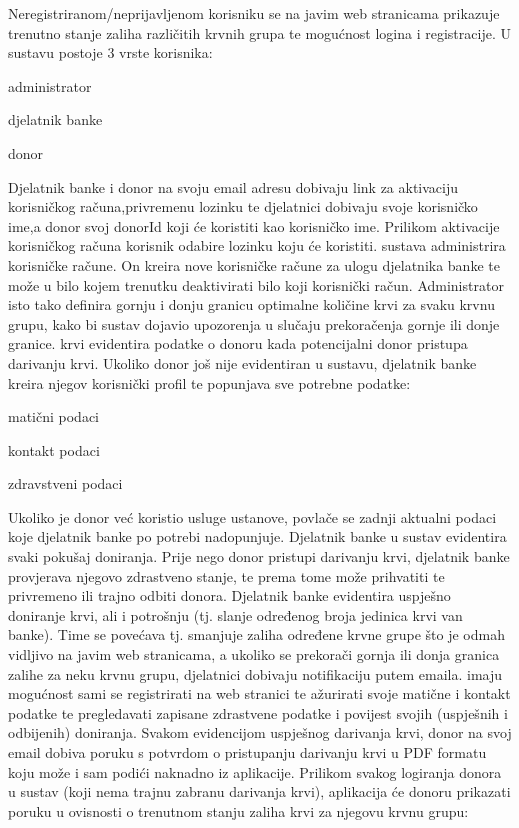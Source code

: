 		Neregistriranom/neprijavljenom korisniku se na javim web stranicama prikazuje trenutno stanje zaliha različitih krvnih grupa te mogućnost logina i registracije. U sustavu postoje 3 vrste korisnika:
		\begin{packed_item}
			\item{administrator}
			\item{djelatnik banke}
			\item{donor}
		\end{packed_item}
		Djelatnik banke i donor na svoju email adresu dobivaju link za aktivaciju korisničkog računa,privremenu lozinku te djelatnici dobivaju svoje korisničko ime,a donor svoj donorId koji će koristiti kao korisničko ime. Prilikom aktivacije korisničkog računa korisnik odabire lozinku koju će koristiti.
		sustava administrira korisničke račune. On kreira nove korisničke račune za ulogu djelatnika banke te može u bilo kojem trenutku deaktivirati bilo koji korisnički račun. Administrator isto tako definira gornju i donju granicu optimalne količine krvi za svaku krvnu grupu, kako bi sustav dojavio upozorenja u slučaju prekoračenja gornje ili donje granice.
		krvi evidentira podatke o donoru kada potencijalni donor pristupa darivanju krvi. Ukoliko donor još nije evidentiran u sustavu, djelatnik banke kreira njegov korisnički profil te popunjava sve potrebne podatke:
		\begin{packed_item}
			\item{matični podaci}
			\item{kontakt podaci}
			\item{zdravstveni podaci}
		\end{packed_item}
		Ukoliko je donor već koristio usluge ustanove, povlače se zadnji aktualni podaci koje djelatnik banke po potrebi nadopunjuje. Djelatnik banke u sustav evidentira svaki pokušaj doniranja. Prije nego donor pristupi darivanju krvi, djelatnik banke provjerava njegovo zdrastveno stanje, te prema tome može prihvatiti te privremeno ili trajno odbiti donora.
		Djelatnik banke evidentira uspješno doniranje krvi, ali i potrošnju (tj. slanje određenog broja jedinica krvi van banke). Time se povećava tj. smanjuje zaliha određene krvne grupe što je odmah vidljivo na javim web stranicama, a ukoliko se prekorači gornja ili donja granica zalihe za neku krvnu grupu, djelatnici dobivaju notifikaciju putem emaila.
		imaju mogućnost sami se registrirati na web stranici te ažurirati svoje matične i kontakt podatke te pregledavati zapisane zdrastvene podatke i povijest svojih (uspješnih i odbijenih) doniranja. Svakom evidencijom uspješnog darivanja krvi, donor na svoj email dobiva poruku s potvrdom o pristupanju darivanju krvi u PDF formatu koju može i sam podići naknadno iz aplikacije. Prilikom svakog logiranja donora u sustav (koji nema trajnu zabranu darivanja krvi), aplikacija će donoru prikazati poruku u ovisnosti o trenutnom stanju zaliha krvi za njegovu krvnu grupu:
